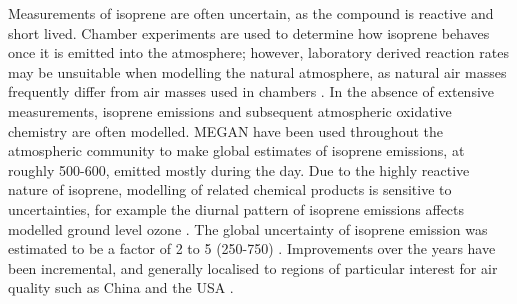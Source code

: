     Measurements of isoprene are often uncertain, as the compound is reactive and short lived.
    Chamber experiments are used to determine how isoprene behaves once it is emitted into the atmosphere; however, laboratory derived reaction rates may be unsuitable when modelling the natural atmosphere, as natural air masses frequently differ from air masses used in chambers \parencite{Kanakidou2005, Nguyen2014}.
    In the absence of extensive measurements, isoprene emissions and subsequent atmospheric oxidative chemistry are often modelled.
    MEGAN  have been used throughout the atmospheric community to make global estimates of isoprene emissions, at roughly 500-600\tgpyr, emitted mostly during the day.
    Due to the highly reactive nature of isoprene, modelling of related chemical products is sensitive to uncertainties, for example the diurnal pattern of isoprene emissions affects modelled ground level ozone \parencite{Fan2004, Hewitt2011}.
    The global uncertainty of isoprene emission was estimated to be a factor of 2 to 5 (250-750\tgpyr) \parencite{Kanakidou2005}.
    Improvements over the years have been incremental, and generally localised to regions of particular interest for air quality such as China and the USA \parencite{Guenther2012, Jiang2018}.
    
